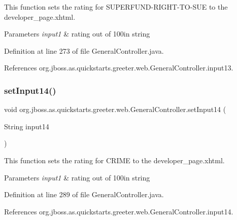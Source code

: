This function sets the rating for S\+U\+P\+E\+R\+F\+U\+N\+D-\/\+R\+I\+G\+H\+T-\/\+T\+O-\/\+S\+UE to the developer\+\_\+page.\+xhtml. 


\begin{DoxyParams}{Parameters}
{\em input1} & rating out of 100in string \\
\hline
\end{DoxyParams}


Definition at line 273 of file General\+Controller.\+java.



References org.\+jboss.\+as.\+quickstarts.\+greeter.\+web.\+General\+Controller.\+input13.

\mbox{\label{classorg_1_1jboss_1_1as_1_1quickstarts_1_1greeter_1_1web_1_1_general_controller_a652b82061739ac7de0bee60b9dfd53f5}} 
\subsubsection{\texorpdfstring{set\+Input14()}{setInput14()}}
{\footnotesize\ttfamily void org.\+jboss.\+as.\+quickstarts.\+greeter.\+web.\+General\+Controller.\+set\+Input14 (\begin{DoxyParamCaption}\item[{String}]{input14 }\end{DoxyParamCaption})}



This function sets the rating for C\+R\+I\+ME to the developer\+\_\+page.\+xhtml. 


\begin{DoxyParams}{Parameters}
{\em input1} & rating out of 100in string \\
\hline
\end{DoxyParams}


Definition at line 289 of file General\+Controller.\+java.



References org.\+jboss.\+as.\+quickstarts.\+greeter.\+web.\+General\+Controller.\+input14.

